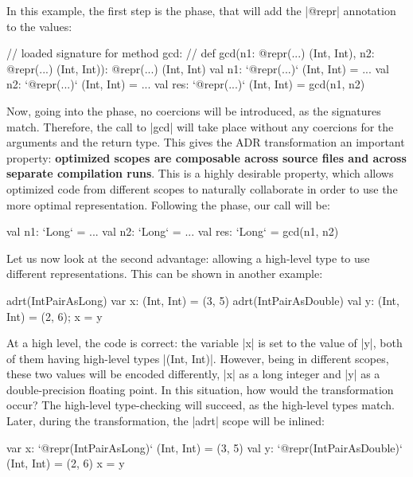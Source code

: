 In this example, the first step is the \inject{} phase, that will add the |@repr| annotation to the values:

\begin{lstlisting-nobreak}
// loaded signature for method gcd:
//  def gcd(n1: @repr(...) (Int, Int), n2: @repr(...) (Int, Int)): @repr(...) (Int, Int)
val n1: `@repr(...)` (Int, Int) = ...
val n2: `@repr(...)` (Int, Int) = ...
val res: `@repr(...)` (Int, Int) = gcd(n1, n2)
\end{lstlisting-nobreak}

Now, going into the \coerce{} phase, no coercions will be introduced, as the signatures match. Therefore, the call to |gcd| will take place without any coercions for the arguments and the return type. This gives the ADR transformation an important property: \textbf{optimized scopes are composable across source files and across separate compilation runs}. This is a highly desirable property, which allows optimized code from different scopes to naturally collaborate in order to use the more optimal representation. Following the \commit{} phase, our call will be:

\begin{lstlisting-nobreak}
val n1: `Long` = ...
val n2: `Long` = ...
val res: `Long` = gcd(n1, n2)
\end{lstlisting-nobreak}

Let us now look at the second advantage: allowing a high-level type to use different representations. This can be shown in another example:

\begin{lstlisting-nobreak}
adrt(IntPairAsLong)   { var x: (Int, Int) = (3, 5) }
adrt(IntPairAsDouble) { val y: (Int, Int) = (2, 6); x = y }
\end{lstlisting-nobreak}

At a high level, the code is correct: the variable |x| is set to the value of |y|, both of them having high-level types |(Int, Int)|. However, being in different scopes, these two values will be encoded differently, |x| as a long integer and |y| as a double-precision floating point. In this situation, how would the transformation occur? The high-level type-checking will succeed, as the high-level types match. Later, during the \inject{} transformation, the |adrt| scope will be inlined:

\begin{lstlisting-nobreak}
var x: `@repr(IntPairAsLong)` (Int, Int) = (3, 5)
val y: `@repr(IntPairAsDouble)` (Int, Int) = (2, 6)
x = y
\end{lstlisting-nobreak}


